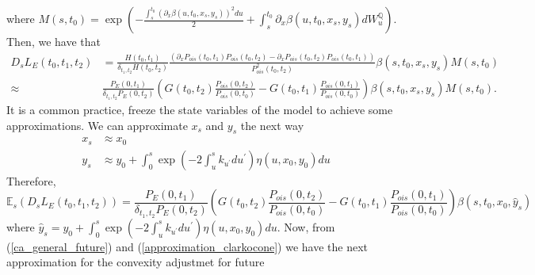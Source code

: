 \documentclass[a4paper,10pt]{article}
\newcommand{\1}{\mathbf{1}}
\begin{document}
where $M(s,t_0)=\exp\left(-\frac{\int_{s}^{t_0} \left(\partial_x \beta(u,t_0,x_s,y_s)\right)^{2} du}{2} + \int_{s}^{t_0} \partial_x \beta(u,t_0,x_s,y_s) dW^{\mathbb{Q}}_u \right)$. 
Then, we have that
\begin{align*}
D_s L_{E}(t_0,t_1,t_2) &= \frac{H(t_0,t_1)}{\delta_{t_1,t_2}H(t_0,t_2)}\frac{\left(\partial_{x}P_{ois}(t_0,t_1)P_{ois}(t_0,t_2) - \partial_{x}P_{ois}(t_0,t_2) P_{ois}(t_0,t_1) \right)}{P^{2}_{ois}(t_0,t_2)} \beta(s,t_0, x_s, y_s)M(s,t_0) \nonumber \\
\approx& \frac{P_{E}(0,t_1)}{\delta_{t_1,t_2} P_{E}(0,t_2)} \left(G(t_0,t_2) \frac{P_{ois}(0,t_2)}{P_{ois}(0,t_0)} - G(t_0,t_1) \frac{P_{ois}(0,t_1)}{P_{ois}(0,t_0)} \right)\beta(s,t_0, x_s, y_s)M(s,t_0).
\end{align*}
It is a common practice, freeze the state variables of the model to achieve some approximations. We can approximate $x_s$ and $y_s$ the next way
\begin{align*}
x_s &\approx x_0 \nonumber \\
y_s &\approx y_0 + \int_{0}^{s} \exp\left(-2\int_{u}^{s} k_{u^{\prime}} du^{\prime} \right) \eta(u,x_0,y_0) du
\end{align*}
Therefore, 
\begin{equation}\label{approximation_clarkocone}
\mathbb{E}_s\left( D_s L_{E}(t_0,t_1,t_2) \right) = \frac{P_{E}(0,t_1)}{\delta_{t_1,t_2} P_{E}(0,t_2)} \left(G(t_0,t_2) \frac{P_{ois}(0,t_2)}{P_{ois}(0,t_0)} - G(t_0,t_1) \frac{P_{ois}(0,t_1)}{P_{ois}(0,t_0)}\right)\beta(s,t_0, x_0, \hat{y}_s)
\end{equation}
where $\hat{y}_s = y_0 + \int_{0}^{s} \exp\left(-2\int_{u}^{s} k_{u^{\prime}} du^{\prime} \right) \eta(u,x_0,y_0) du$.
Now, from (\ref{ca_general_future}) and (\ref{approximation_clarkocone}) we have the next approximation for the convexity adjustmet for future
\end{document}
